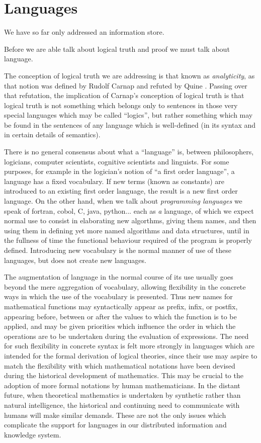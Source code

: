 \documentclass[10pt,titlepage]{book}
\begin{document}
\section{Languages}

We have so far only addressed an information store.

Before we are able talk about logical truth and proof we must talk about language.

The conception of logical truth we are addressing is that known as \emph{analyticity}, as that notion was defined by Rudolf Carnap \cite{carnap47,schilpp63} and refuted by Quine \cite{quine51b,quine61a}.
Passing over that refutation, the implication of Carnap's conception of logical truth  is that logical truth is not something which belongs only to sentences in those very special languages which may be called ``logics'', but rather something which may be found in the sentences of any language which is well-defined (in its syntax and in certain details of semantics).

There is no general consensus about what a ``language'' is, between philosophers, logicians, computer scientists, cognitive scientists and linguists.
For some purposes, for example in the logician's notion of ``a first order language'', a language has a fixed vocabulary.
If new terms (known as constants) are introduced to an existing first order language, the result is a new first order language.
On the other hand, when we talk about \emph{programming languages} we speak of fortran, cobol, C, java, python... each as \emph{a} language, of which we expect normal use to consist in elaborating new algorthms, giving them names, and then using them in defining yet more named  algorithms and data structures, until in the fullness of time the functional behaviour required of the program is properly defined.
Introducing new vocabulary is the normal manner of use of these languages, but does not create new languages.

The augmentation of language in the normal course of its use usually goes beyond the mere aggregation of vocabulary, allowing flexibility in the concrete ways in which the use of the vocabulary is presented.
Thus new names for mathematical functions may syntactically appear as prefix, infix, or postfix, appearing before, between or after the values to which the function is to be applied, and may be given priorities which influence the order in which the operations are to be undertaken during the evaluation of expressions.
The need for such flexibility in concrete syntax is felt more strongly in languages which are intended for the formal derivation of logical theories, since their use may aspire to match the flexibility with which mathematical notations have been devised during the historical development of mathematics.
This may be crucial to the adoption of more formal notations by human mathematicians.
In the distant future, when theoretical mathematics is undertaken by synthetic rather than natural intelligence, the historical and continuing need to communicate with humans will make similar demands.
These are not the only issues which complicate the support for languages in our distributed information and knowledge system.
\end{document}
